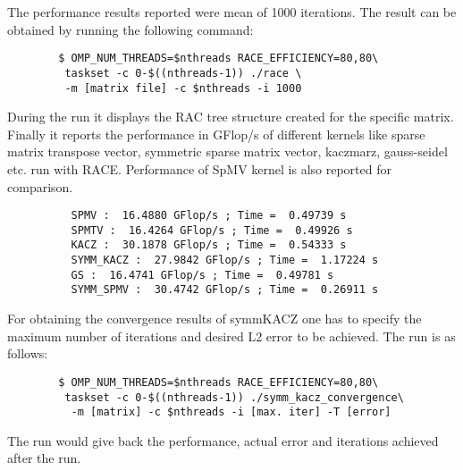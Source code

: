 	The performance results reported were mean of 1000 iterations. The result can be obtained by running the following command:
	\begin{lstlisting}
		$ OMP_NUM_THREADS=$nthreads RACE_EFFICIENCY=80,80\
		 taskset -c 0-$((nthreads-1)) ./race \
		 -m [matrix file] -c $nthreads -i 1000
	\end{lstlisting}
	During the run it displays the RAC tree structure created for the specific matrix. Finally it reports the performance in GFlop/s of different kernels like sparse matrix transpose vector, symmetric sparse matrix vector, kaczmarz, gauss-seidel etc. run with RACE. Performance of SpMV kernel is also reported for comparison.
	\begin{lstlisting}
	      SPMV :  16.4880 GFlop/s ; Time =  0.49739 s
	      SPMTV :  16.4264 GFlop/s ; Time =  0.49926 s
	      KACZ :  30.1878 GFlop/s ; Time =  0.54333 s
	      SYMM_KACZ :  27.9842 GFlop/s ; Time =  1.17224 s
	      GS :  16.4741 GFlop/s ; Time =  0.49781 s
	      SYMM_SPMV :  30.4742 GFlop/s ; Time =  0.26911 s
	\end{lstlisting}
	
	For obtaining the convergence results of symmKACZ one has to specify the maximum number of iterations and desired L2 error to be achieved. The run is as follows:
	\begin{lstlisting}
		$ OMP_NUM_THREADS=$nthreads RACE_EFFICIENCY=80,80\
		 taskset -c 0-$((nthreads-1)) ./symm_kacz_convergence\
		  -m [matrix] -c $nthreads -i [max. iter] -T [error] 
	\end{lstlisting} 
	
	The run would give back the performance, actual error and iterations achieved after the run.
	
	



